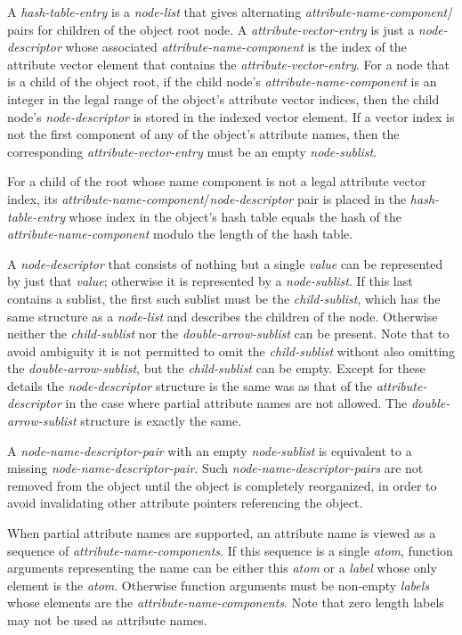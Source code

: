 \documentclass[12pt]{article}
\newcommand{\EOL}{\penalty \exhyphenpenalty}
\begin{document}
A {\em hash-table-entry} is a {\em node-list} that gives alternating
{\em attribute-name-component}/\EOL {\em node-\EOL de\-scrip\-tor} pairs for
children of the object root node.  A {\em attribute-vector-entry}
is just a {\em node-descriptor} whose associated {\em attribute-name-component}
is the index of the attribute vector element that contains the
{\em attribute-vector-entry}.
For a node that is a child of the object root,
if the child node's {\em attribute-name-component} is an integer in the legal
range of the object's attribute vector indices, then the child node's
{\em node-descriptor} is stored in
the indexed vector element.
If a vector index is not the first component of
any of the object's attribute names, then the corresponding
{\em attribute-vector-entry} must be an empty {\em node-sublist}.

For a child of the root whose name component is not a legal attribute
vector index, its {\em attribute-name-component}/{\em node-descriptor}
pair is placed in the {\em hash-table-entry}
whose index in the object's hash table equals the hash of the
{\em attribute-name-component} modulo the length of the hash table.

A {\em node-descriptor} that consists of nothing but a single {\em value}
can be represented by just that {\em value}; otherwise it is represented
by a {\em node-sublist}.  If this last contains a sublist, the first
such sublist must
be the {\em child-sublist}, which has the same structure as a {\em node-list}
and describes the children of the node.  Otherwise neither the
{\em child-sublist} nor the {\em double-arrow-sublist} can be present.
Note that to avoid ambiguity it is not permitted to omit the
{\em child-sublist} without also omitting
the {\em double-arrow-sublist}, but the
{\em child-sublist} can be empty.  Except for these details
the {\em node-descriptor} structure is the same was as that of the
{\em attribute-descriptor} in the case where partial attribute names are
not allowed.  The {\em double-arrow-sublist} structure is exactly
the same.

A {\em node-name-descriptor-pair} with an empty {\em node-sublist}
is equivalent to a missing {\em node-name-descriptor-pair}.
Such {\em node-name-descriptor-pairs} are not
removed from the object until the object is completely reorganized,
in order to avoid invalidating other attribute pointers referencing the object.

When partial attribute names are supported, an attribute name is viewed
as a sequence of {\em attribute-name-components}.  If this sequence is
a single {\em atom}, function arguments representing the name can be
either this {\em atom} or a {\em label} whose only element is the {\em atom}.
Otherwise function arguments must be non-empty
{\em labels} whose elements are the {\em attribute-name-components}.
Note that zero length labels may not be used as attribute names.
\end{document}
